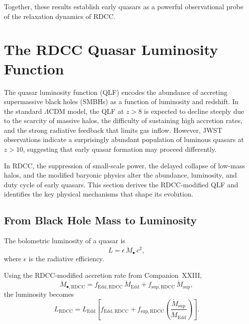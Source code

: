 \documentclass[11pt,a4paper]{article}
\begin{document}
Together, these results establish early quasars as a powerful observational probe of the
relaxation dynamics of RDCC.

\section{The RDCC Quasar Luminosity Function}

The quasar luminosity function (QLF) encodes the abundance of accreting supermassive
black holes (SMBHs) as a function of luminosity and redshift. In the standard
$\Lambda$CDM model, the QLF at $z > 8$ is expected to decline steeply due to the scarcity
of massive halos, the difficulty of sustaining high accretion rates, and the strong radiative
feedback that limits gas inflow. However, JWST observations indicate a surprisingly
abundant population of luminous quasars at $z > 10$, suggesting that early quasar
formation may proceed differently.

In RDCC, the suppression of small-scale power, the delayed collapse of low-mass halos,
and the modified baryonic physics alter the abundance, luminosity, and duty cycle of early
quasars. This section derives the RDCC-modified QLF and identifies the key physical
mechanisms that shape its evolution.

\subsection{From Black Hole Mass to Luminosity}

The bolometric luminosity of a quasar is
\begin{equation}
L
=
\epsilon\,
\dot{M}_{\bullet}\,
c^{2},
\end{equation}
where $\epsilon$ is the radiative efficiency.

Using the RDCC-modified accretion rate from Companion~XXIII,
\begin{equation}
\dot{M}_{\bullet,\mathrm{RDCC}}
=
f_{\mathrm{Edd,RDCC}}\,
\dot{M}_{\mathrm{Edd}}
+
f_{\mathrm{sup,RDCC}}\,
\dot{M}_{\mathrm{sup}},
\end{equation}
the luminosity becomes
\begin{equation}
L_{\mathrm{RDCC}}
=
L_{\mathrm{Edd}}
\left[
f_{\mathrm{Edd,RDCC}}
+
f_{\mathrm{sup,RDCC}}
\left(
\frac{\dot{M}_{\mathrm{sup}}}{\dot{M}_{\mathrm{Edd}}}
\right)
\right].
\end{equation}
\end{document}
